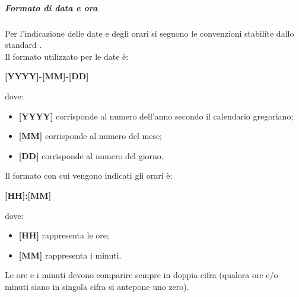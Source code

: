 \subparagraph{Formato di data e ora}
Per l'indicazione delle date e degli orari si seguono le convenzioni stabilite dallo standard . \\

Il formato utilizzato per le date è:
\begin{center}
    \textbf{[YYYY]-[MM]-[DD]}
\end{center}
dove:
\begin{itemize}
    \item \textbf{[YYYY]} corrisponde al numero dell'anno secondo il calendario gregoriano;
    \item \textbf{[MM]} corrisponde al numero del mese;
    \item \textbf{[DD]} corrisponde al numero del giorno.
\end{itemize}

Il formato con cui vengono indicati gli orari è:
\begin{center}
    \textbf{[HH]:[MM]}
\end{center}
dove:
\begin{itemize}
    \item \textbf{[HH]} rappresenta le ore;
    \item \textbf{[MM]} rappresenta i minuti.
\end{itemize}
Le ore e i minuti devono comparire sempre in doppia cifra (qualora ore e/o minuti siano in singola cifra si antepone uno zero).


